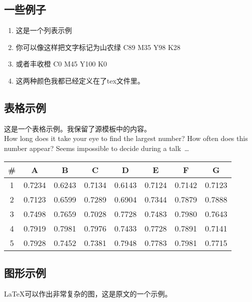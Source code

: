 \documentclass[
	paper=128mm:96mm,	%
	fontsize=11pt,					%
	pagesize,							%
	parskip=half-,					%
	numbers=noendperiod,	%
	captions=nooneline			%
	]{scrartcl}							%
\newcommand*{\mygreen}[1]{\textcolor{mygreen}{#1}}
\newcommand*{\myred}[1]{\textcolor{myred}{#1}}
\newcommand*{\sdaugreen}[1]{\textcolor{sdaugreen}{#1}}
\newcommand*{\harvestorange}[1]{\textcolor{harvestorange}{#1}}
\theoremstyle{mythmstyle}
\begin{document}
\begin{CJK*}{UTF8}{gbsn}
\clearpage
%
%
\section{一些例子}
\begin{enumerate}
	\item 这是一个列表示例
	\item 你可以像\sdaugreen{这样}把文字标记为\sdaugreen{山农绿 C89 M35 Y98 K28}
	\item \harvestorange{或者丰收橙 C0 M45 Y100 K0}
	\item 这两种颜色我都已经定义在了tex文件里。 
\end{enumerate}	
\clearpage
%
%
\subsection{表格示例}
这是一个表格示例。我保留了源模板中的内容。\\
How long does it take your eye to find the largest number? How often does this number appear? Seems \myred{impossible} to decide during a talk~\dots

\begin{tabularx}{\textwidth}{@{\extracolsep{\fill}}cccccccc}
   \toprule
   \multicolumn{1}{c}{\#}&\multicolumn{1}{c}{A}&\multicolumn{1}{c}{B}&\multicolumn{1}{c}{C}&\multicolumn{1}{c}{D}&\multicolumn{1}{c}{E}&\multicolumn{1}{c}{F}&\multicolumn{1}{c}{G}\\ 
   \midrule
   1&0.7234&0.6243&0.7134&0.6143&0.7124&0.7142&0.7123\\
   2&0.7123&0.6599&0.7289&0.6904&0.7344&0.7879&0.7888\\
   3&0.7498&0.7659&0.7028&0.7728&0.7483&0.7980&0.7643\\
   4&0.7919&0.7981&0.7976&0.7433&0.7728&0.7891&0.7141\\
   5&0.7928&0.7452&0.7381&0.7948&0.7783&0.7981&0.7715\\
   \bottomrule
\end{tabularx}
\clearpage
%
%
\subsection{图形示例}
\begin{minipage}[c]{0.8\textwidth}
\LaTeX{}可以作出非常复杂的图，这是原文的一个示例。
\end{minipage}
\clearpage
%
%

\end{CJK*}
\end{document}
